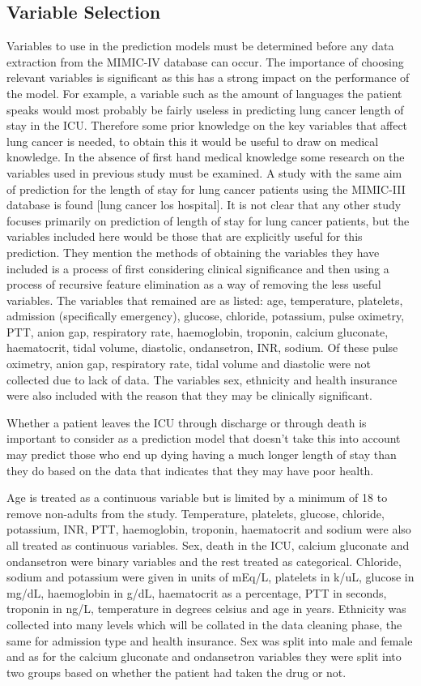 \documentclass[11pt]{article}
\begin{document}
\subsection{Variable Selection}
Variables to use in the prediction models must be determined before any data extraction from the MIMIC-IV database can occur. The importance of choosing relevant variables is significant as this has a strong impact on the performance of the model. For example, a variable such as the amount of languages the patient speaks would most probably be fairly useless in predicting lung cancer length of stay in the ICU. Therefore some prior knowledge on the key variables that affect lung cancer is needed, to obtain this it would be useful to draw on medical knowledge. In the absence of first hand medical knowledge some research on the variables used in previous study must be examined. A study with the same aim of prediction for the length of stay for lung cancer patients using the MIMIC-III database is found [lung cancer los hospital].  It is not clear that any other study focuses primarily on prediction of length of stay for lung cancer patients, but the variables included here would be those that are explicitly useful for this prediction. They mention the methods of obtaining the variables they have included is a process of first considering clinical significance and then using a process of recursive feature elimination as a way of removing the less useful variables. The variables that remained are as listed: age, temperature, platelets, admission (specifically emergency), glucose, chloride, potassium, pulse oximetry, PTT, anion gap, respiratory rate, haemoglobin, troponin, calcium gluconate, haematocrit, tidal volume, diastolic, ondansetron, INR, sodium. Of these pulse oximetry, anion gap, respiratory rate, tidal volume and diastolic were not collected due to lack of data. The variables sex, ethnicity and health insurance were also included with the reason that they may be clinically significant. 

Whether a patient leaves the ICU through discharge or through death is important to consider as a prediction model that doesn't take this into account may predict those who end up dying having a much longer length of stay than they do based on the data that indicates that they may have poor health.

Age is treated as a continuous variable but is limited by a minimum of 18 to remove non-adults from the study. Temperature, platelets, glucose, chloride, potassium, INR, PTT, haemoglobin, troponin, haematocrit and sodium were also all treated as continuous variables. Sex, death in the ICU, calcium gluconate and ondansetron were binary variables and the rest treated as categorical. Chloride, sodium and potassium were given in units of mEq/L, platelets in k/uL, glucose in mg/dL, haemoglobin in g/dL, haematocrit as a percentage, PTT in seconds, troponin in ng/L, temperature in degrees celsius and age in years. Ethnicity was collected into many levels which will be collated in the data cleaning phase, the same for admission type and health insurance. Sex was split into male and female and as for the calcium gluconate and ondansetron variables they were split into two groups based on whether the patient had taken the drug or not.
\end{document}
